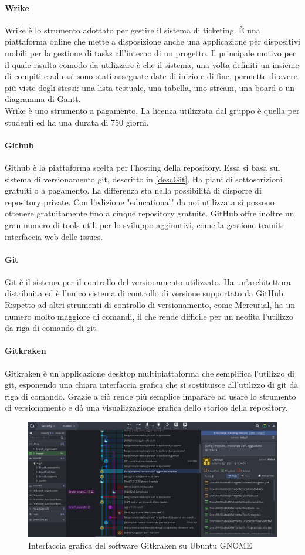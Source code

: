 		\paragraph{Wrike} \Spazio
		Wrike è lo strumento adottato per gestire il sistema di ticketing. È una piattaforma online che mette a disposizione anche una applicazione per dispositivi mobili per la gestione di tasks all'interno di un progetto. Il principale motivo per il quale risulta comodo da utilizzare è che il sistema, una volta definiti un insieme di compiti e ad essi sono stati  assegnate date di inizio e di fine, permette di avere più viste degli stessi: una lista testuale, una tabella, uno stream, una board o un diagramma di Gantt. \\ Wrike è uno strumento a pagamento. La licenza utilizzata dal gruppo è quella per studenti ed ha una durata di 750 giorni.
		
		\paragraph{Github} \Spazio
		Github è la piattaforma scelta per l'hosting della repository. Essa si basa sul sistema di versionamento git, descritto in \ref{descGit}. Ha piani di sottoscrizioni gratuiti o a pagamento. La differenza sta nella possibilità di disporre di repository private. Con l'edizione "educational" da noi utilizzata si possono ottenere gratuitamente fino a cinque repository gratuite. GitHub offre inoltre un gran numero di tools utili per lo sviluppo aggiuntivi, come la gestione tramite interfaccia web delle issues.
		
		\paragraph{Git} \Spazio
		Git\label{descGit} è il sistema per il controllo del versionamento utilizzato. Ha un'architettura distribuita ed è l'unico sistema di controllo di versione supportato da GitHub. Rispetto ad altri strumenti di controllo di versionamento, come Mercurial, ha un numero molto maggiore di comandi, il che rende difficile per un neofita l'utilizzo da riga di comando di git.
		
		\paragraph{Gitkraken} \Spazio
		Gitkraken è un'applicazione desktop multipiattaforma che semplifica l'utilizzo di git, esponendo una chiara interfaccia grafica che si sostituisce all'utilizzo di git da riga di comando. Grazie a ciò rende più semplice imparare ad usare lo strumento di versionamento e dà una visualizzazione grafica dello storico della repository.
		
		\begin{figure}[H]
			\centering
			\includegraphics[width=1\textwidth]{Images/gitkraken.png}
			\caption{Interfaccia grafica del software Gitkraken su Ubuntu GNOME}
		\end{figure}
